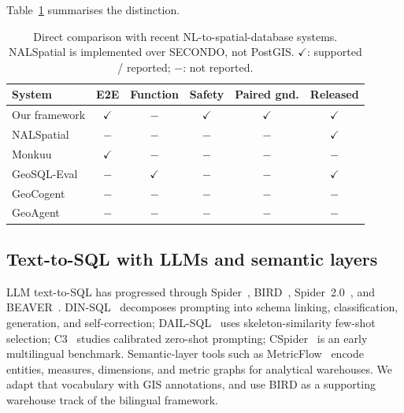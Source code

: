 Table~\ref{tab:related-comp} summarises the distinction.

\begin{table}[t]\centering\footnotesize
\caption{Direct comparison with recent NL-to-spatial-database systems. NALSpatial is implemented over SECONDO, not PostGIS. $\checkmark$: supported / reported; $-$: not reported.}
\label{tab:related-comp}
\setlength{\tabcolsep}{3pt}
\begin{tabular*}{\textwidth}{@{\extracolsep{\fill}}lccccc@{}}
\toprule
System & E2E & Function & Safety & Paired gnd. & Released \\
\midrule
Our framework                          & $\checkmark$ & $-$           & $\checkmark$ & $\checkmark$ & $\checkmark$ \\
NALSpatial~\citep{liu2025nalspatial}    & $-$           & $-$           & $-$           & $-$           & $\checkmark$ \\
Monkuu~\citep{yu2025monkuu}             & $\checkmark$ & $-$           & $-$           & $-$           & $-$           \\
GeoSQL-Eval~\citep{hou2026geosql}       & $-$           & $\checkmark$ & $-$           & $-$           & $\checkmark$ \\
GeoCogent~\citep{houcoding2025}         & $-$           & $-$           & $-$           & $-$           & $-$           \\
GeoAgent~\citep{lin2026geoagent}        & $-$           & $-$           & $-$           & $-$           & $-$           \\
\bottomrule
\end{tabular*}
\end{table}

\subsection{Text-to-SQL with LLMs and semantic layers}

LLM text-to-SQL has progressed through Spider~\citep{yu2018spider,rajkumar2022evaluating}, BIRD~\citep{li2023bird}, Spider~2.0~\citep{lei2025spider2}, and BEAVER~\citep{chen2024beaver}. DIN-SQL~\citep{pourreza2023dinsql} decomposes prompting into schema linking, classification, generation, and self-correction; DAIL-SQL~\citep{gao2024dail} uses skeleton-similarity few-shot selection; C3~\citep{dong2023c3} studies calibrated zero-shot prompting; CSpider~\citep{min2019cspider} is an early multilingual benchmark. Semantic-layer tools such as MetricFlow~\citep{metricflow} encode entities, measures, dimensions, and metric graphs for analytical warehouses. We adapt that vocabulary with GIS annotations, and use BIRD as a supporting warehouse track of the bilingual framework.


